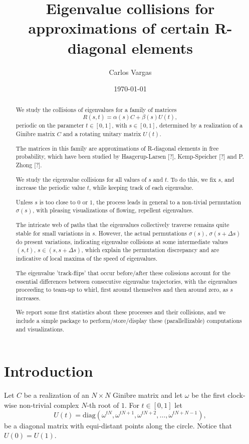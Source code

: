 \documentclass{article}
\title{Eigenvalue collisions for approximations of certain R-diagonal elements}
\author{Carlos Vargas}
\date{\today}
\begin{document}
	\maketitle	
	\begin{abstract}
		We study the collisions of eigenvalues for a family of matrices 
		$$R(s,t) = \alpha(s)C + \beta(s)U(t),$$ 
		periodic on the parameter $t\in [0,1]$, with $s\in [0, 1]$,   
		determined by a realization of a Ginibre matrix $C$ 
		and a rotating unitary matrix $U(t)$. 
		
		The matrices in this family are approximations of 
		R-diagonal elements in free probability, which have been studied by 
		Haagerup-Larsen [?], Kemp-Speicher [?] and P. Zhong [?]. 
		
		We study the eigenvalue collisions for all values of $s$ and $t$. 
		To do this, we fix $s$, and increase the periodic value $t$, 
		while keeping track of each eigenvalue.	
		
		Unless $s$ is too close to $0$ or $1$, 
		the process leads in general to a non-tivial permutation $\sigma(s)$, 
		with pleasing visualizations of flowing, repellent eigenvalues.
		
		The intricate web of paths that the eigenvalues collectively traverse 
		remains quite stable for small variations in $s$. 
		However, the actual permutations $\sigma(s)$, $\sigma(s + \Delta s)$ 
		do present variations, 
		indicating eigenvalue collisions 
		at some intermediate values $(s,t)$, $s\in (s, s + \Delta s)$,
		which explain the permutation discrepancy 
		and are indicative of local maxima of the speed of eigenvalues. 
		
		The eigenvalue 'track-flips' that occur before/after these colissions 
		account for the essential differences between consecutive eigenvalue trajectories,
		with the eigenvalues proceeding to team-up 
		to whirl, first around themselves and then around zero, as $s$ increases.
		
		We report some first statistics about these processes and their collisions, 
		and we include a simple package to perform/store/display these (parallellizable) 
		computations and visualizations.
 	\end{abstract}
	\section{Introduction}

	Let $C$ be a realization of an $N\times N$ Ginibre matrix 
	and let $\omega$ be the first clock-wise non-trivial complex $N$-th root of $1$. 
	For $t\in [0,1]$ let
	$$U(t) = \mathrm{diag}(\omega^{tN}, \omega^{tN+1}, \omega^{tN+2}, \dots   , \omega^{tN+N-1}),$$ 
	be a diagonal matrix with equi-distant points along the circle. Notice that $U(0) = U(1)$.
\end{document}
